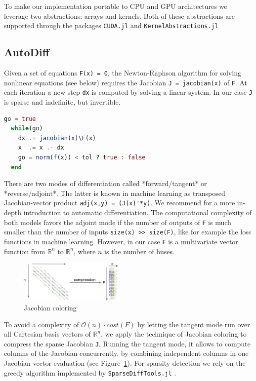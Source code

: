 \documentclass{juliacon}
\newcommand{\reffig}[1]{Figure~\ref{#1}}
\begin{document}
To make our implementation portable to CPU and GPU architectures we leverage
two abstractions: arrays and kernels. Both of these abstractions are
supported through the packages \lstinline{CUDA.jl} \cite{besard2018juliagpu,besard2019prototyping} and \lstinline{KernelAbstractions.jl}

\subsection{AutoDiff}

Given a set of equations \lstinline{F(x) = 0}, the Newton-Raphson algorithm for
solving nonlinear equations (see below) requires the Jacobian \lstinline{J = jacobian(x)}
of \lstinline{F}. At each iteration a new step \lstinline{dx} is computed by
solving a linear system. In our case \lstinline{J} is sparse and indefinite, but
invertible.

\begin{lstlisting}[language = Julia]
  go = true
  while(go)
    dx .= jacobian(x)\F(x)
    x  .= x .- dx
    go = norm(f(x)) < tol ? true : false
  end
\end{lstlisting}

There are two modes of differentiation called *forward/tangent* or
*reverse/adjoint*. The latter is known in machine learning as
transposed Jacobian-vector product \lstinline{adj(x,y) = (J(x)'*y)}. We recommend
\cite{griewank2008evaluating} for a more in-depth introduction to automatic
differentiation. The computational complexity of both models favors the
adjoint mode if the number of outputs of \lstinline{F} is much smaller than the
number of inputs \lstinline{size(x) >> size(F)}, like for example the loss functions
in machine learning. However, in our case \lstinline{F} is a multivariate vector
function from $\mathbb{R}^n$ to $\mathbb{R}^n$, where $n$ is the number of
buses.
\newcommand{\bigo}[1]{\mathcal{O}\left( #1 \right)}

\begin{figure}
    \centering
    \includegraphics[width=0.45\textwidth]{figures/compression.png}
    \caption{Jacobian coloring}
    \label{fig:coloring}
\end{figure}

To avoid a complexity of $\bigo{n} \cdot cost(F)$ by letting the tangent mode
run over all Cartesian basis vectors of $\mathbb{R}^n$, we apply the technique of Jacobian
coloring to compress the sparse Jacobian \lstinline{J}. Running the tangent mode, it
allows to compute columns of the Jacobian concurrently, by combining
independent columns in one Jacobian-vector evaluation (see
\reffig{fig:coloring}). For sparsity detection we rely on the greedy
algorithm implemented by \lstinline{SparseDiffTools.jl} \cite{sparsedifftools}.
\end{document}
